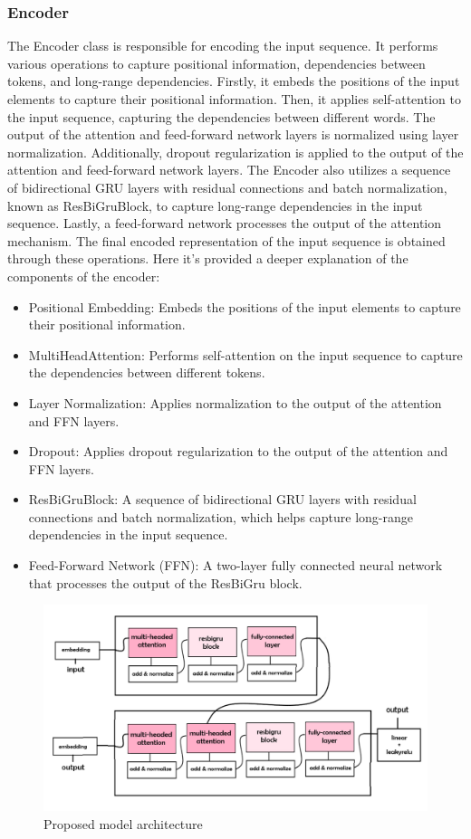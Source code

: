 \documentclass[a4paper, noexaminfo]{sapthesis}
\begin{document}
\subsubsection{Encoder}
The Encoder class is responsible for encoding the input sequence. It 
performs various operations to capture positional information, 
dependencies between tokens, and long-range dependencies. Firstly, 
it embeds the positions of the input elements to capture their positional 
information. Then, it applies self-attention to the input sequence, 
capturing the dependencies between different words. The output of the 
attention and feed-forward network layers is normalized using layer 
normalization. Additionally, dropout regularization is applied to the 
output of the attention and feed-forward network layers. The Encoder 
also utilizes a sequence of bidirectional GRU layers with residual 
connections and batch normalization, known as ResBiGruBlock, to capture 
long-range dependencies in the input sequence. Lastly, a feed-forward 
network processes the output of the attention mechanism. The final 
encoded representation of the input sequence is obtained through 
these operations.
Here it's provided a deeper explanation of the components of the encoder:
\begin{itemize}
\item Positional Embedding: Embeds the positions of the input elements to 
capture their positional information.
\item MultiHeadAttention: Performs self-attention on the input sequence 
to capture the dependencies between different tokens.
\item Layer Normalization: Applies normalization to the output of the 
attention and FFN layers.
\item Dropout: Applies dropout regularization to the output of the 
attention and FFN layers.
\item  ResBiGruBlock: A sequence of bidirectional GRU layers with 
residual connections and batch normalization, which helps capture long-range dependencies in the input sequence.
\item Feed-Forward Network (FFN): A two-layer fully connected neural 
network that processes the output of the ResBiGru block.
\end{itemize}
\begin{figure}[h!]
  \centering
  \includegraphics[width=1\linewidth]{images/bigru_light.png}
  \caption{Proposed model architecture}
  \end{figure}
\end{document}
